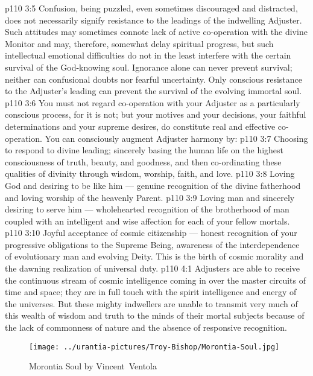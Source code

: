 \vs p110 3:5 \pc Confusion, being puzzled, even sometimes discouraged and distracted, does not necessarily signify resistance to the leadings of the indwelling Adjuster. Such attitudes may sometimes connote lack of active co\hyp{}operation with the divine Monitor and may, therefore, somewhat delay spiritual progress, but such intellectual emotional difficulties do not in the least interfere with the certain survival of the God\hyp{}knowing soul. Ignorance alone can never prevent survival; neither can confusional doubts nor fearful uncertainty. Only conscious resistance to the Adjuster’s leading can prevent the survival of the evolving immortal soul.
\vs p110 3:6 You must not regard co\hyp{}operation with your Adjuster as a particularly conscious process, for it is not; but your motives and your decisions, your faithful determinations and your supreme desires, do constitute real and effective co\hyp{}operation. You can consciously augment Adjuster harmony by:
\vs p110 3:7 \bibnobreakspace Choosing to respond to divine leading; sincerely basing the human life on the highest consciousness of truth, beauty, and goodness, and then co\hyp{}ordinating these qualities of divinity through wisdom, worship, faith, and love.
\vs p110 3:8 \bibnobreakspace Loving God and desiring to be like him --- genuine recognition of the divine fatherhood and loving worship of the heavenly Parent.
\vs p110 3:9 \bibnobreakspace Loving man and sincerely desiring to serve him --- wholehearted recognition of the brotherhood of man coupled with an intelligent and wise affection for each of your fellow mortals.
\vs p110 3:10 \bibnobreakspace Joyful acceptance of cosmic citizenship --- honest recognition of your progressive obligations to the Supreme Being, awareness of the interdependence of evolutionary man and evolving Deity. This is the birth of cosmic morality and the dawning realization of universal duty.
\vs p110 4:1 Adjusters are able to receive the continuous stream of cosmic intelligence coming in over the master circuits of time and space; they are in full touch with the spirit intelligence and energy of the universes. But these mighty indwellers are unable to transmit very much of this wealth of wisdom and truth to the minds of their mortal subjects because of the lack of commonness of nature and the absence of responsive recognition.
\begin{figure}[H]
\centering
\texttt{[image: ../urantia-pictures/Troy-Bishop/Morontia-Soul.jpg]}
\caption{Morontia Soul by Vincent~Ventola}
\end{figure}

